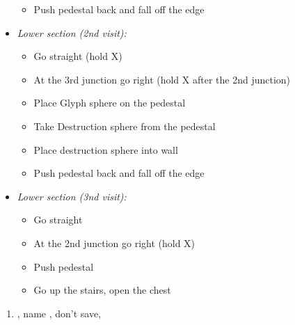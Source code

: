 \begin{trial}
\begin{itemize}
\begin{itemize}
				\item Push pedestal back and fall off the edge
			\end{itemize}
		\item \textit{Lower section (2nd visit):}
			\begin{itemize}
				\item Go straight (hold X)
				\item At the 3rd junction go right (hold X after the 2nd junction)
				\item Place Glyph sphere on the pedestal
				\item Take Destruction sphere from the pedestal
				\item Place destruction sphere into wall
				\item Push pedestal back and fall off the edge
			\end{itemize}
		\item \textit{Lower section (3nd visit):}
			\begin{itemize}
				\item Go straight
				\item At the 2nd junction go right (hold X)
				\item Push pedestal
				\item Go up the stairs, open the chest
			\end{itemize}
	\end{itemize}
\end{trial}
\begin{enumerate}[resume]
	\item \sd, name \bahamut, don't save, \sd
\end{enumerate}
\lossvfill
\ 
\losscb
\ \lossnewline \ 
